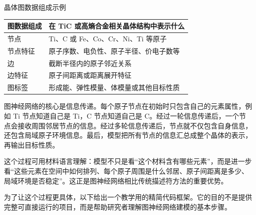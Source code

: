 \begin{formalTable}[htbp]
\caption{晶体图数据组成示例}
\label{tab:crystal-graph-data-components}
\begin{tabularx}{\textwidth}{@{}YY@{}}
\toprule
\textbf{图数据组成} & \textbf{在 TiC 或高熵合金相关晶体结构中表示什么} \\
\midrule
节点 & Ti、C 或 Fe、Co、Cr、Ni、Ti 等原子 \\
节点特征 & 原子序数、电负性、原子半径、价电子数等 \\
边 & 截断半径内的原子邻近关系 \\
边特征 & 原子间距离或距离展开特征 \\
图标签 & 形成能、弹性模量、体模量或其他目标性质 \\
\bottomrule
\end{tabularx}
\end{formalTable}

图神经网络的核心是信息传递。每个原子节点在初始时只包含自己的元素属性，例如 Ti 节点知道自己是 Ti，C 节点知道自己是 C。经过一轮信息传递后，一个节点会接收周围邻居节点的信息。经过多轮信息传递后，节点就不仅包含自身信息，还包含局域原子环境信息。最后，模型把所有节点的信息汇总成整个晶体的表示，再输出目标性质。


这个过程可用材料语言理解：模型不只是看“这个材料含有哪些元素”，而是进一步看“这些元素在空间中如何排列、每个原子周围是什么邻居、原子间距离是多少、局域环境是否稳定”。这正是图神经网络相比传统描述符方法的重要优势。


为了让这个过程更具体，以下给出一个教学用的精简代码框架。它的目的不是提供完整可直接运行的项目，而是帮助研究者理解图神经网络建模的基本步骤。


